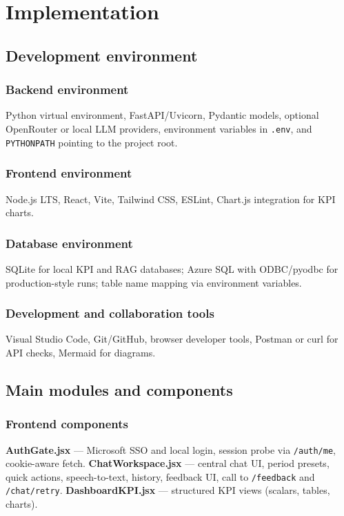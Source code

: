 \chapter{Implementation}

\section{Development environment}
\subsection{Backend environment}
Python virtual environment, FastAPI/Uvicorn, Pydantic models, optional OpenRouter or local LLM providers, environment variables in \texttt{.env}, and \texttt{PYTHONPATH} pointing to the project root.

\subsection{Frontend environment}
Node.js LTS, React, Vite, Tailwind CSS, ESLint, Chart.js integration for KPI charts.

\subsection{Database environment}
SQLite for local KPI and RAG databases; Azure SQL with ODBC/pyodbc for production-style runs; table name mapping via environment variables.

\subsection{Development and collaboration tools}
Visual Studio Code, Git/GitHub, browser developer tools, Postman or curl for API checks, Mermaid for diagrams.

\section{Main modules and components}
\subsection{Frontend components}
\textbf{AuthGate.jsx} --- Microsoft SSO and local login, session probe via \texttt{/auth/me}, cookie-aware fetch. \textbf{ChatWorkspace.jsx} --- central chat UI, period presets, quick actions, speech-to-text, history, feedback UI, call to \texttt{/feedback} and \texttt{/chat/retry}. \textbf{DashboardKPI.jsx} --- structured KPI views (scalars, tables, charts).

